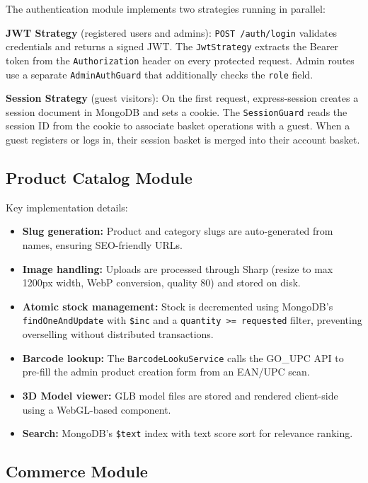 The authentication module implements two strategies running in parallel:

\textbf{JWT Strategy} (registered users and admins): \texttt{POST /auth/login}
validates credentials and returns a signed JWT. The \texttt{JwtStrategy} extracts
the Bearer token from the \texttt{Authorization} header on every protected request.
Admin routes use a separate \texttt{AdminAuthGuard} that additionally checks the
\texttt{role} field.

\textbf{Session Strategy} (guest visitors): On the first request, express-session
creates a session document in MongoDB and sets a cookie. The \texttt{SessionGuard}
reads the session ID from the cookie to associate basket operations with a guest.
When a guest registers or logs in, their session basket is merged into their account
basket.

\subsection{Product Catalog Module}

Key implementation details:

\begin{itemize}
    \item \textbf{Slug generation:} Product and category slugs are auto-generated from names, ensuring SEO-friendly URLs.
    \item \textbf{Image handling:} Uploads are processed through Sharp (resize to max 1200px width, WebP conversion, quality 80) and stored on disk.
    \item \textbf{Atomic stock management:} Stock is decremented using MongoDB's \texttt{findOneAndUpdate} with \texttt{\$inc} and a \texttt{quantity >= requested} filter, preventing overselling without distributed transactions.
    \item \textbf{Barcode lookup:} The \texttt{BarcodeLookuService} calls the GO\_UPC API to pre-fill the admin product creation form from an EAN/UPC scan.
    \item \textbf{3D Model viewer:} GLB model files are stored and rendered client-side using a WebGL-based component.
    \item \textbf{Search:} MongoDB's \texttt{\$text} index with text score sort for relevance ranking.
\end{itemize}

\subsection{Commerce Module}

